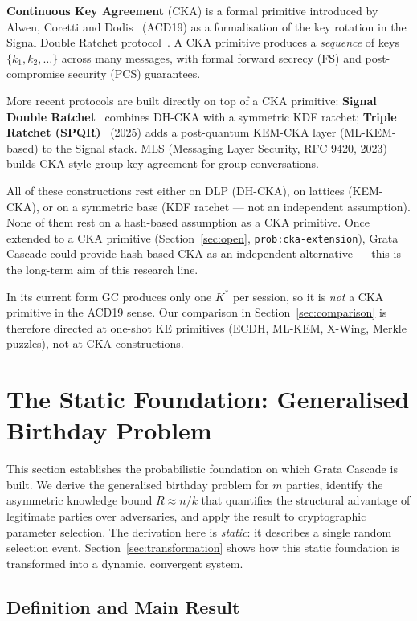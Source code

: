 \documentclass[11pt,a4paper]{article}
\begin{document}
\textbf{Continuous Key Agreement} (CKA) is a formal primitive introduced by Alwen, Coretti and Dodis~\cite{ACD19} (ACD19) as a formalisation of the key rotation in the Signal Double Ratchet protocol~\cite{DR2017}. A CKA primitive produces a \emph{sequence} of keys $\{k_1, k_2, \ldots\}$ across many messages, with formal forward secrecy (FS) and post-compromise security (PCS) guarantees.

More recent protocols are built directly on top of a CKA primitive: \textbf{Signal Double Ratchet}~\cite{DR2017} combines DH-CKA with a symmetric KDF ratchet; \textbf{Triple Ratchet (SPQR)}~\cite{SPQR2025} (2025) adds a post-quantum KEM-CKA layer (ML-KEM-based) to the Signal stack. MLS (Messaging Layer Security, RFC 9420, 2023) builds CKA-style group key agreement for group conversations.

All of these constructions rest either on DLP (DH-CKA), on lattices (KEM-CKA), or on a symmetric base (KDF ratchet --- not an independent assumption). None of them rest on a hash-based assumption as a CKA primitive. Once extended to a CKA primitive (Section~\ref{sec:open}, \texttt{prob:cka-extension}), Grata Cascade could provide hash-based CKA as an independent alternative --- this is the long-term aim of this research line.

In its current form GC produces only one $K^*$ per session, so it is \emph{not} a CKA primitive in the ACD19 sense. Our comparison in Section~\ref{sec:comparison} is therefore directed at one-shot KE primitives (ECDH, ML-KEM, X-Wing, Merkle puzzles), not at CKA constructions.

\section{The Static Foundation: Generalised Birthday Problem}\label{sec:static}

This section establishes the probabilistic foundation on which Grata Cascade is built. We derive the generalised birthday problem for $m$ parties, identify the asymmetric knowledge bound $R \approx n/k$ that quantifies the structural advantage of legitimate parties over adversaries, and apply the result to cryptographic parameter selection. The derivation here is \emph{static}: it describes a single random selection event. Section~\ref{sec:transformation} shows how this static foundation is transformed into a dynamic, convergent system.

\subsection{Definition and Main Result}
\end{document}
